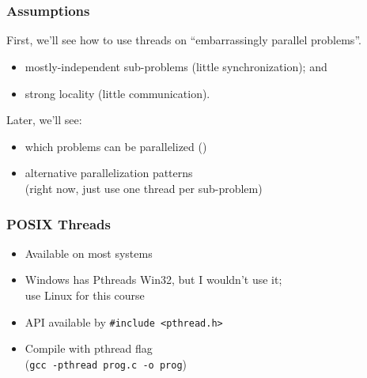 \documentclass[aspectratio=43]{beamer}
\newenvironment{changemargin}[1]{%
  \begin{list}{}{%
    \setlength{\topsep}{0pt}%
    \setlength{\leftmargin}{#1}%
    \setlength{\rightmargin}{1em}
    \setlength{\listparindent}{\parindent}%
    \setlength{\itemindent}{\parindent}%
    \setlength{\parsep}{\parskip}%
  }%
  \item[]}{\end{list}}
\begin{document}
\section{}
\begin{frame}
  \frametitle{Assumptions}

  \begin{changemargin}{0.5cm}
  First, we'll see how to use threads on ``embarrassingly parallel problems''.
  \begin{itemize}
    \item mostly-independent sub-problems (little synchronization); and
    \item strong locality (little communication).
  \end{itemize}
  \vfill
  Later, we'll see:
  \begin{itemize}
    \item which problems can be parallelized ()
    \item alternative parallelization patterns\\(right now, just use one thread
          per sub-problem)
  \end{itemize}
  \end{changemargin}
\end{frame}

\begin{frame}
  \frametitle{POSIX Threads}

  \begin{changemargin}{1.5cm}
  \begin{itemize}
    \item Available on most systems
    \vfill
    \item Windows has Pthreads Win32, but I wouldn't use it; \\use Linux for
          this course
    \vfill
    \item API available by {\tt \#include <pthread.h>}
    \vfill
    \item Compile with pthread flag \\ ({\tt gcc -pthread prog.c -o prog})
  \end{itemize}
  \end{changemargin}
\end{frame}

\end{document}
